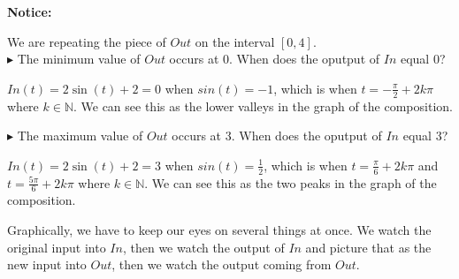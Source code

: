 \documentclass{ximera}
\begin{document}
\textbf{\textcolor{red!70!black}{Notice:}} 



We are repeating the piece of $Out$ on the interval $[0,4]$.  \\



$\blacktriangleright$ The minimum value of $Out$ occurs at $0$.  When does the oputput of $In$ equal $0$?



$In(t) = 2 \sin(t)+2 = 0$ when $sin(t) = -1$, which is when $t = -\frac{\pi}{2} + 2k\pi$ where $k \in \mathbb{N}$. We can see this as the lower valleys in the graph of the composition.





$\blacktriangleright$ The maximum value of $Out$ occurs at $3$.  When does the oputput of $In$ equal $3$?



$In(t) = 2 \sin(t)+2 = 3$ when $sin(t) = \frac{1}{2}$, which is when $t = \frac{\pi}{6} + 2k\pi$ and $t = \frac{5\pi}{6} + 2k\pi$ where $k \in \mathbb{N}$. We can see this as the two peaks in the graph of the composition.

















Graphically, we have to keep our eyes on several things at once.  We watch the original input into $In$, then we watch the output of $In$ and picture that as the new input into $Out$, then we watch the output coming from $Out$.
\end{document}
